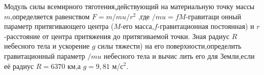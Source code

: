 Модуль силы всемирного тяготения,действующий на материальную точку массы $m$,определяется равенством $F=m/mu/r^2$ ,где $/mu=fM$-гравитаци
онный параметр притягивающего центра ($M$-его масса,$f$-гравитационная постоянная) и $r$-расстояние от центра притяжения до притягиваемой точки.
Зная радиус $R$ небесного тела и ускорение $g$ силы тяжести) на его поверхности,определить гравитационный параметр $/mu$ небесного тела и вычис
лить его для Земли,если её радиус $R=6370$ км,а $g=9,81$ м/с$^2$.
